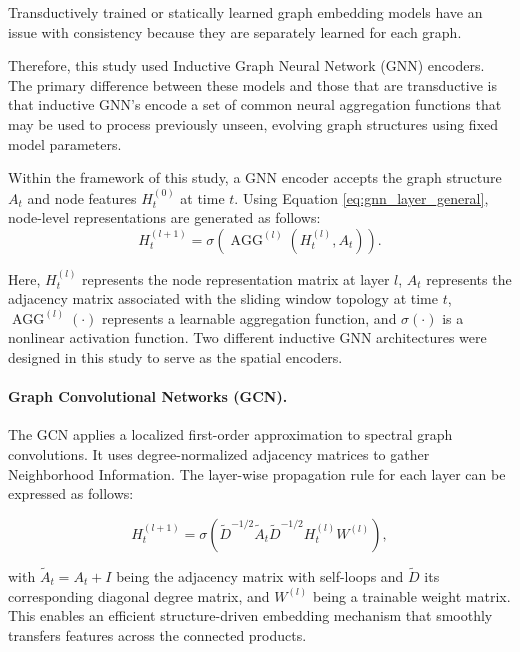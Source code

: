 Transductively trained or statically learned graph embedding models have an issue with consistency because they are separately learned for each graph.

Therefore, this study used Inductive Graph Neural Network (GNN) encoders. The primary difference between these models and those that are transductive is that inductive GNN's encode a set of common neural aggregation functions that may be used to process previously unseen, evolving graph structures using fixed model parameters.

Within the framework of this study, a GNN encoder accepts the graph structure \(A_t\) and node features \(H_t^{(0)}\) at time \(t\). Using Equation \ref{eq:gnn_layer_general}, node-level representations are generated as follows: 
\begin{equation}
H_t^{(l+1)} = 
\sigma\left(
\operatorname{AGG}^{(l)}\left(H_t^{(l)}, A_t\right)
\right).
\label{eq:gnn_layer_general}
\end{equation}

Here, $H_t^{(l)}$ represents the node representation matrix at layer $l$, $A_t$ represents the adjacency matrix associated with the sliding window topology at time $t$, $\operatorname{AGG}^{(l)}(\cdot)$ represents a learnable aggregation function, and $\sigma(\cdot)$ is a nonlinear activation function. Two different inductive GNN architectures were designed in this study to serve as the spatial encoders.


\paragraph{Graph Convolutional Networks (GCN). }

The GCN applies a localized first-order approximation to spectral graph convolutions. It uses degree-normalized adjacency matrices to gather Neighborhood Information. The layer-wise propagation rule for each layer can be expressed as follows:

\begin{equation}
    H_t^{(l+1)} =
    \sigma\left(
        \tilde{D}^{-1/2} \tilde{A}_t \tilde{D}^{-1/2} H_t^{(l)} W^{(l)}
    \right),
    \label{eq:gcn_update}
\end{equation}

with \({\tilde{A}_{t}} = {A_{t}} + {I}\) being the adjacency matrix with self-loops and \({\tilde{D}}\) its corresponding diagonal degree matrix, and \(W ^{\left(l\right)}\) being a trainable weight matrix. This enables an efficient structure-driven embedding mechanism that smoothly transfers features across the connected products.

